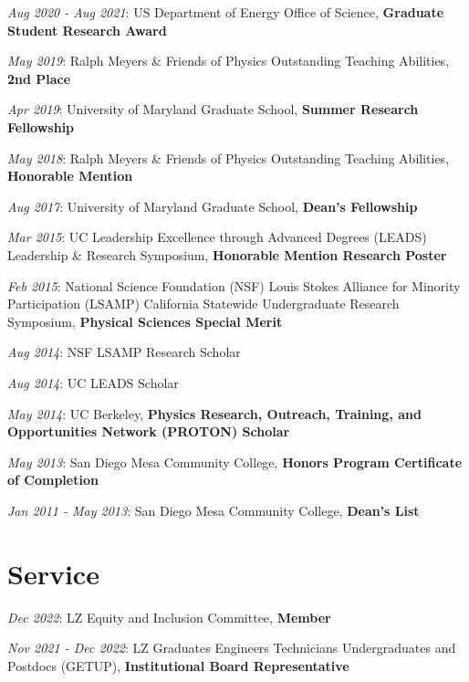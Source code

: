 \documentclass[
  10pt,
  letterpaper,
  DIV=11,
  numbers=noendperiod]{scrartcl}
\begin{document}
\textcolor{mygray}{\textit{Aug 2020 - Aug 2021}}: US Department of
Energy Office of Science, \textbf{Graduate Student Research Award}

\textcolor{mygray}{\textit{May 2019}}: Ralph Meyers \& Friends of
Physics Outstanding Teaching Abilities, \textbf{2nd Place}

\textcolor{mygray}{\textit{Apr 2019}}: University of Maryland Graduate
School, \textbf{Summer Research Fellowship}

\textcolor{mygray}{\textit{May 2018}}: Ralph Meyers \& Friends of
Physics Outstanding Teaching Abilities, \textbf{Honorable Mention}

\textcolor{mygray}{\textit{Aug 2017}}: University of Maryland Graduate
School, \textbf{Dean's Fellowship}

\textcolor{mygray}{\textit{Mar 2015}}: UC Leadership Excellence through
Advanced Degrees (LEADS) Leadership \& Research Symposium,
\textbf{Honorable Mention Research Poster}

\textcolor{mygray}{\textit{Feb 2015}}: National Science Foundation (NSF)
Louis Stokes Alliance for Minority Participation (LSAMP) California
Statewide Undergraduate Research Symposium, \textbf{Physical Sciences
Special Merit}

\textcolor{mygray}{\textit{Aug 2014}}: NSF LSAMP Research Scholar

\textcolor{mygray}{\textit{Aug 2014}}: UC LEADS Scholar

\textcolor{mygray}{\textit{May 2014}}: UC Berkeley, \textbf{Physics
Research, Outreach, Training, and Opportunities Network (PROTON)
Scholar}

\textcolor{mygray}{\textit{May 2013}}: San Diego Mesa Community College,
\textbf{Honors Program Certificate of Completion}

\textcolor{mygray}{\textit{Jan 2011 - May 2013}}: San Diego Mesa
Community College, \textbf{Dean's List}

\hypertarget{fa-people-carry-service}{%
\section{\texorpdfstring{
Service}{ Service}}\label{fa-people-carry-service}}

\textcolor{mygray}{\textit{Dec 2022}}: LZ Equity and Inclusion
Committee, \textbf{Member}

\textcolor{mygray}{\textit{Nov 2021 - Dec 2022}}: LZ Graduates Engineers
Technicians Undergraduates and Postdocs (GETUP), \textbf{Institutional
Board Representative}
\end{document}
